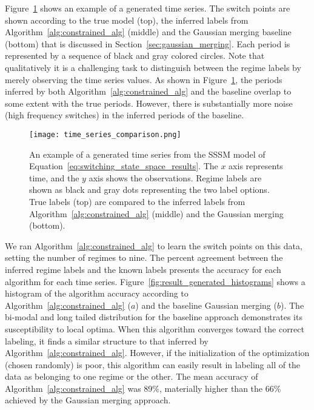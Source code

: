 Figure~\ref{fig:result_generated_time_series_with_labels} shows an example of a generated time series. The switch points are shown according to the true model (top), the inferred labels from Algorithm~\ref{alg:constrained_alg} (middle) and the Gaussian merging baseline (bottom) that is discussed in Section~\ref{sec:gaussian_merging}. Each period is represented by a sequence of black and gray colored circles. Note that qualitatively it is a challenging task to distinguish between the regime labels by merely observing the time series values. As shown in Figure~\ref{fig:result_generated_time_series_with_labels}, the periods inferred by both Algorithm~\ref{alg:constrained_alg} and the baseline overlap to some extent with the true periods. However, there is substantially more noise (high frequency switches) in the inferred periods of the baseline.

\begin{figure}
\centering
\texttt{[image: time\_series\_comparison.png]}
\caption{An example of a generated time series from the SSSM model of Equation~\ref{eq:switching_state_space_results}. The $x$ axis represents time, and the $y$ axis shows the observations. Regime labels are shown as black and gray dots representing the two label options. True labels (top) are compared to the inferred labels from Algorithm~\ref{alg:constrained_alg} (middle) and the Gaussian merging (bottom).}
\label{fig:result_generated_time_series_with_labels}
\end{figure}

We ran Algorithm~\ref{alg:constrained_alg} to learn the switch points on this data, setting the number of regimes to nine. The percent agreement between the inferred regime labels and the known labels presents the accuracy for each algorithm for each time series. Figure~\ref{fig:result_generated_histograms} shows a histogram of the algorithm accuracy according to Algorithm~\ref{alg:constrained_alg} ($a$) and the baseline Gaussian merging ($b$). The bi-modal and long tailed distribution for the baseline approach demonstrates its susceptibility to local optima. When this algorithm converges toward the correct labeling, it finds a similar structure to that inferred by Algorithm~\ref{alg:constrained_alg}. However, if the initialization of the optimization (chosen randomly) is poor, this algorithm can easily result in labeling all of the data as belonging to one regime or the other. The mean accuracy of Algorithm~\ref{alg:constrained_alg} was 89\%, materially higher than the 66\% achieved by the Gaussian merging approach.

